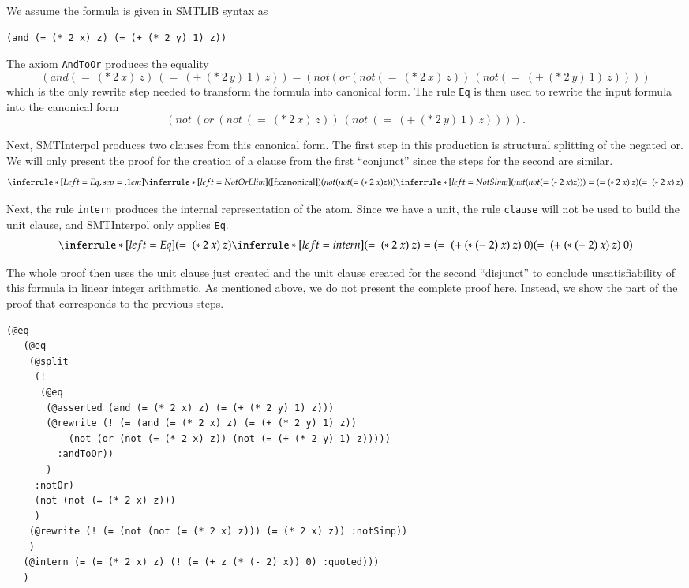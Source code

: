 \documentclass[a4paper]{article}
\newcommand\si{SMTInterpol\xspace}
\begin{document}
We assume the formula is given in SMTLIB syntax as
\begin{verbatim}
(and (= (* 2 x) z) (= (+ (* 2 y) 1) z))
\end{verbatim}

The axiom \texttt{AndToOr} produces the equality
\[
(and (=\ (*\ 2\ x)\ z)\ (=\ (+\ (*\ 2\ y)\ 1)\ z)) =
(not (or (not (=\ (*\ 2\ x)\ z))\ (not (=\ (+\ (*\ 2\ y)\ 1)\ z))))
\]
which is the only rewrite step needed to transform the formula into canonical
form.  The rule \texttt{Eq} is then used to rewrite the input formula
into the canonical form
\[
(not\ (or\ (not\ (=\ (*\ 2\ x)\ z))\ (not\ (=\ (+\ (*\ 2\ y)\ 1)\ z))))\tag{canonical}\label{f:canonical}.
\]

Next, \si produces two clauses from this canonical form.  The first step in
this production is structural splitting of the negated or.  We will only
present the proof for the creation of a clause from the first ``conjunct''
since the steps for the second are similar.
\[
\inferrule*[Left=Eq,sep=.1em]{
  \inferrule*[left=NotOrElim]{(\ref{f:canonical})}{(not (not (= (*\ 2\ x) z)))}\\
  \inferrule*[left=NotSimp]{ }{(not (not (= (*\ 2\ x) z))) =
    (= (*\ 2\ x)\ z)}}
           {(=\ (*\ 2\ x)\ z)}
\]

Next, the rule \texttt{intern} produces the internal representation of the
atom.  Since we have a unit, the rule \texttt{clause} will not be used to
build the unit clause, and \si only applies \texttt{Eq}.
\[
\inferrule*[left=Eq]{(=\ (*\ 2\ x)\ z) \\
  \inferrule*[left=intern]{ }{(=\ (*\ 2\ x)\ z) = (=\ (+\ (*\ (-\ 2)\ x)\ z)\ 
    0)}}
           {(=\ (+\ (*\ (-\ 2)\ x)\ z)\ 0)}
\]

The whole proof then uses the unit clause just created and the unit clause
created for the second ``disjunct'' to conclude unsatisfiability of this
formula in linear integer arithmetic.  As mentioned above, we do not present
the complete proof here.  Instead, we show the part of the proof that
corresponds to the previous steps.
\begin{verbatim}
(@eq
   (@eq
    (@split
     (! 
      (@eq
       (@asserted (and (= (* 2 x) z) (= (+ (* 2 y) 1) z)))
       (@rewrite (! (= (and (= (* 2 x) z) (= (+ (* 2 y) 1) z))
           (not (or (not (= (* 2 x) z)) (not (= (+ (* 2 y) 1) z)))))
         :andToOr))
       )
     :notOr)
     (not (not (= (* 2 x) z)))
     )
    (@rewrite (! (= (not (not (= (* 2 x) z))) (= (* 2 x) z)) :notSimp))
    )
   (@intern (= (= (* 2 x) z) (! (= (+ z (* (- 2) x)) 0) :quoted)))
   )
\end{verbatim}
\end{document}
